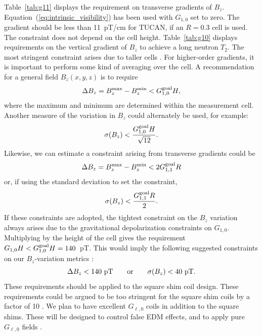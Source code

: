 \documentclass[preprint,12pt]{elsarticle}
\begin{document}
Table~\ref{tab:g11} displays the requirement on transverse gradients of $B_z$. Equation~(\ref{eq:intrinsic_visibility}) has been used with $G_{1,0}$ set to zero. The gradient should be less than 11~pT/cm for TUCAN, if an $R=0.3$ cell is used. The constraint does not depend on the cell height. Table~\ref{tab:g10} displays requirements on the vertical gradient of $B_z$ to achieve a long neutron $T_2$. The most stringent constraint arises due to taller cells \cite{bib:MartinT2Note2020}. For higher-order gradients, it is important to perform some kind of averaging over the cell. A recommendation for a general field $B_z(x,y,z)$ is to require
\begin{equation}
  \Delta B_z=B_z^{\rm max}-B_z^{\rm min}<G_{1,0}^{\rm goal}H,
\end{equation}
where the maximum and minimum are determined within the measurement cell. Another measure of the variation in $B_z$ could alternately be used, for example:
\begin{equation}
  \sigma(B_z)<\frac{G_{1,0}^{\rm goal}H}{\sqrt{12}}.
\end{equation}
Likewise, we can estimate a constraint arising from transverse gradients could be
\begin{equation}
  \Delta B_z=B_z^{\rm max}-B_z^{\rm min}<2G_{1,1}^{\rm goal}R
\end{equation}
or, if using the standard deviation to set the constraint,
\begin{equation}
  \sigma(B_z)<\frac{G_{1,1}^{\rm goal}R}{2}.
\end{equation}
If these constraints are adopted, the tightest constraint on the $B_z$ variation always arises due to the gravitational depolarization constraints on $G_{1,0}$. Multiplying by the height of the cell gives the requirement $G_{1,0}H<G_{1,0}^{\rm goal}H=140$~pT. This would imply the following suggested constraints on our $B_z$-variation metrics \cite{bib:MartinT2Note2020}:
\begin{equation}
  \Delta B_z<140~{\rm pT}\qquad\text{or}\qquad\sigma(B_z)<40~{\rm pT}.
  \label{eq:bzmetrics}
\end{equation}
These requirements should be applied to the square shim coil design. These requirements could be argued to be too stringent for the square shim coils by a factor of 10 \cite{bib:MartinT2Note2020}. We plan to have excellent $G_{\ell,0}$ coils in addition to the square shims. These will be designed to control false EDM effects, and to apply pure $G_{\ell,0}$ fields \cite{bib:MartinT2Note2020}.
\end{document}
